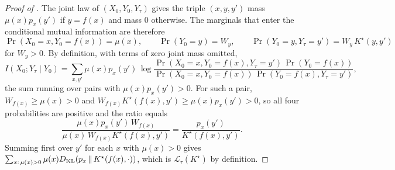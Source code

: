 \begin{proof}[Proof of ]
The joint law of $(X_0,Y_0,Y_\tau)$ gives the triple $(x,y,y')$ mass $\mu(x)p_x(y')$ if $y=f(x)$ and mass $0$ otherwise.
The marginals that enter the conditional mutual information are therefore
\[
  \Pr(X_0=x,Y_0=f(x))=\mu(x),\qquad \Pr(Y_0=y)=W_y,\qquad \Pr(Y_0=y,Y_\tau=y')=W_y\,K^\star(y,y')
\]
for $W_y>0$.
By definition, with terms of zero joint mass omitted,
\[
  I(X_0;Y_\tau\mid Y_0)=\sum_{x,y'}\mu(x)p_x(y')\,\log\frac{\Pr(X_0=x,Y_0=f(x),Y_\tau=y')\,\Pr(Y_0=f(x))}{\Pr(X_0=x,Y_0=f(x))\,\Pr(Y_0=f(x),Y_\tau=y')},
\]
the sum running over pairs with $\mu(x)p_x(y')>0$.
For such a pair, $W_{f(x)}\ge\mu(x)>0$ and $W_{f(x)}K^\star(f(x),y')\ge\mu(x)p_x(y')>0$, so all four probabilities are positive and the ratio equals
\[
  \frac{\mu(x)p_x(y')\,W_{f(x)}}{\mu(x)\,W_{f(x)}K^\star(f(x),y')}=\frac{p_x(y')}{K^\star(f(x),y')}.
\]
Summing first over $y'$ for each $x$ with $\mu(x)>0$ gives $\sum_{x:\,\mu(x)>0}\mu(x)D_{\mathrm{KL}}\!\left(p_x\,\middle\|\,K^\star(f(x),\cdot)\right)$, which is $\mathcal{L}_\tau(K^\star)$ by definition.
\end{proof}
